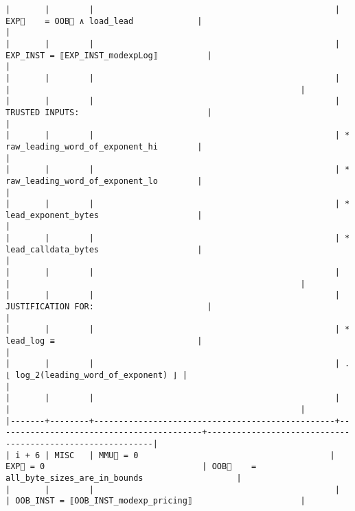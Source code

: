 \documentclass[varwidth=\maxdimen,margin=0.5cm,multi={verbatim}]{standalone}
\begin{document}
\begin{verbatim}
|       |        |                                                 | EXP🏴    = OOB🏴 ∧ load_lead             |                                                           |
|       |        |                                                 | EXP_INST = ⟦EXP_INST_modexpLog⟧          |                                                           |
|       |        |                                                 |                                          |                                                           |
|       |        |                                                 | TRUSTED INPUTS:                          |                                                           |
|       |        |                                                 | * raw_leading_word_of_exponent_hi        |                                                           |
|       |        |                                                 | * raw_leading_word_of_exponent_lo        |                                                           |
|       |        |                                                 | * lead_exponent_bytes                    |                                                           |
|       |        |                                                 | * lead_calldata_bytes                    |                                                           |
|       |        |                                                 |                                          |                                                           |
|       |        |                                                 | JUSTIFICATION FOR:                       |                                                           |
|       |        |                                                 | * lead_log ≡                             |                                                           |
|       |        |                                                 | .    ⌊ log_2(leading_word_of_exponent) ⌋ |                                                           |
|       |        |                                                 |                                          |                                                           |
|-------+--------+-------------------------------------------------+------------------------------------------+-----------------------------------------------------------|
| i + 6 | MISC   | MMU🏴 = 0                                       | EXP🏴 = 0                                | OOB🏴    = all_byte_sizes_are_in_bounds                   |
|       |        |                                                 |                                          | OOB_INST = ⟦OOB_INST_modexp_pricing⟧                      |

\end{verbatim}
\end{document}
